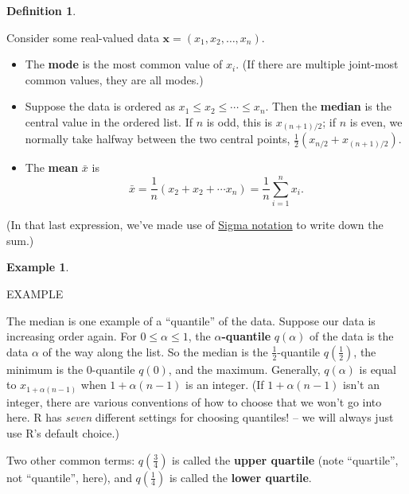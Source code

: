 \documentclass[
  a4paper,
]{book}
\providecommand{\tightlist}{%
  \setlength{\itemsep}{0pt}\setlength{\parskip}{0pt}}
\theoremstyle{definition}
\newtheorem{definition}{Definition}[chapter]
\theoremstyle{definition}
\newtheorem{example}{Example}[chapter]
\theoremstyle{definition}
\theoremstyle{remark}
\begin{document}
\begin{definition}
\protect\hypertarget{def:unlabeled-div-1}{}\label{def:unlabeled-div-1}

Consider some real-valued data \(\mathbf x = (x_1, x_2, \dots, x_n)\).

\begin{itemize}
\tightlist
\item
  The \textbf{mode} is the most common value of \(x_i\). (If there are multiple joint-most common values, they are all modes.)
\item
  Suppose the data is ordered as \(x_1 \leq x_2 \leq \cdots \leq x_n\). Then the \textbf{median} is the central value in the ordered list. If \(n\) is odd, this is \(x_{(n+1)/2}\); if \(n\) is even, we normally take halfway between the two central points, \(\frac12(x_{n/2}+x_{(n+1)/2})\).
\item
  The \textbf{mean} \(\bar x\) is
  \[ \bar x = \frac{1}{n}(x_2 + x_2 + \cdots x_n) = \frac1n \sum_{i=1}^n x_i . \]
\end{itemize}

\end{definition}

(In that last expression, we've made use of \href{https://www.mathcentre.ac.uk/resources/workbooks/mathcentre/sigma.pdf}{Sigma notation} to write down the sum.)

\begin{example}
\protect\hypertarget{exm:unlabeled-div-2}{}\label{exm:unlabeled-div-2}

EXAMPLE

\end{example}

The median is one example of a ``quantile'' of the data. Suppose our data is increasing order again. For \(0 \leq \alpha \leq 1\), the \textbf{\(\alpha\)-quantile} \(q(\alpha)\) of the data is the data \(\alpha\) of the way along the list. So the median is the \(\frac12\)-quantile \(q(\frac12)\), the minimum is the \(0\)-quantile \(q(0)\), and the maximum. Generally, \(q(\alpha)\) is equal to \(x_{1+\alpha(n-1)}\) when \(1+\alpha(n-1)\) is an integer. (If \(1+\alpha(n-1)\) isn't an integer, there are various conventions of how to choose that we won't go into here. R has \emph{seven} different settings for choosing quantiles! -- we will always just use R's default choice.)

Two other common terms: \(q(\frac34)\) is called the \textbf{upper quartile} (note ``quartile'', not ``quantile'', here), and \(q(\frac14)\) is called the \textbf{lower quartile}.
\end{document}
